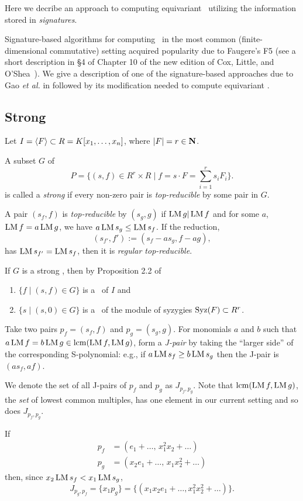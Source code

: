 Here we decribe an approach to computing equivariant \GBs\ utilizing the information stored in {\em signatures}. 

Signature-based algorithms for computing \GBs\ in the most common (finite-dimensional commutative) setting acquired popularity due to Faugere's F5 (see a short description in \S 4 of Chapter 10 of the new edition of Cox, Little, and O'Shea~\cite{Cox-Little-OShea:I-V-A}).      
We give a description of one of the signature-based approaches due to Gao {\em et al.} in \cite{Gao-Volny-Wang:signature-GBs} followed by its modification needed to compute equivariant \GBs.  

\subsection{Strong \GB}

Let $I=\langle F \rangle \subset R=K[x_1,\ldots,x_n]$, where $|F|=r\in\mathbf N$.

A subset $G$ of 
\[
P = \{(s,f)\in R^r\times R \mid f=s\cdot F = \sum_{i=1}^r s_iF_i\}.
\]
is called a {\em strong \GB } if every non-zero pair is {\em top-reducible} by some pair in $G$.

A pair $(s_f,f)$ is {\em top-reducible} by $(s_g,g)$ if $\operatorname{LM} g |\operatorname{LM} f$ and 
for some $a$, $\operatorname{LM} f = a \operatorname{LM} g$, we have $a\operatorname{LM} s_g\leq \operatorname{LM} s_f$.  If the reduction,
\[
(s_{f'},f') := (s_f-as_g,f-ag),
\]
has $\operatorname{LM} s_{f'} = \operatorname{LM} s_f$, then it is {\em regular top-reducible}.

If $G$ is a strong \GB, then by Proposition 2.2 of~\cite{Gao-Volny-Wang:signature-GBs}
\begin{enumerate}
   \item $\{f \mid (s,f)\in G\}$ is a \GB\ of $I$ and 
   \item $\{s \mid (s,0)\in G\}$ is a \GB\ of the module of syzygies $\operatorname{Syz}(F) \subset R^r$.
\end{enumerate}
   
Take two pairs $p_f=(s_f,f)$ and $p_g=(s_g,g)$. For monomials $a$ and $b$ such that $a\operatorname{LM} f = b\operatorname{LM} g \in \operatorname{lcm}(\operatorname{LM} f,\operatorname{LM} g)$, form a {\em J-pair} by taking the ``larger side'' of the corresponding S-polynomial: e.g., if $a\operatorname{LM} s_f \geq b\operatorname{LM} s_g$ then the J-pair is $(as_f,af)$.

We denote the set of all J-pairs of $p_f$ and $p_g$ as $J_{p_f,p_g}$. Note that $\operatorname{lcm}(\operatorname{LM} f,\operatorname{LM} g)$, the {\em set} of lowest common multiples, has one element in our current setting and so does $J_{p_f,p_g}$.  

\begin{example} If 
\begin{align*}
p_f &= (e_1+\ldots,\,x_1^2x_2+\ldots)\\
p_g &= (x_2e_1+\ldots,\,x_1x_2^2+\ldots)
\end{align*}
then, since $x_2\operatorname{LM} s_f < x_1\operatorname{LM} s_g$,
\[
J_{p_g,p_f} = \{x_1p_g\} = \{(x_1x_2e_1+\ldots, x_1^2x_2^2+\ldots)\}.
\]
\end{example}

